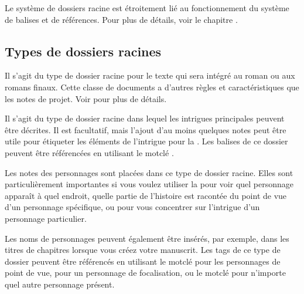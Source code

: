 \documentclass[a4paper,11pt,french]{sphinxmanual}
\begin{document}
\sphinxAtStartPar
Le système de dossiers racine est étroitement lié au fonctionnement du système de balises et de références. Pour plus de détails, voir le chapitre {\hyperref[\detokenize{project_references:a-references}]{}}.


\subsection{Types de dossiers racines}
\label{\detokenize{project_overview:root-folder-types}}\begin{description}
\sphinxAtStartPar
Il s’agit du type de dossier racine pour le texte qui sera intégré au roman ou aux romans finaux. Cette classe de documents a d’autres règles et caractéristiques que les notes de projet. Voir {\hyperref[\detokenize{project_structure:a-struct}]{}} pour plus de détails.

\sphinxAtStartPar
Il s’agit du type de dossier racine dans lequel les intrigues principales peuvent être décrites. Il est facultatif, mais l’ajout d’au moins quelques notes peut être utile pour étiqueter les éléments de l’intrigue pour la . Les balises de ce dossier peuvent être référencées en utilisant le mot\sphinxhyphen{}clé .

\sphinxAtStartPar
Les notes des personnages sont placées dans ce type de dossier racine. Elles sont particulièrement importantes si vous voulez utiliser la  pour voir quel personnage apparaît à quel endroit, quelle partie de l’histoire est racontée du point de vue d’un personnage spécifique, ou pour vous concentrer sur l’intrigue d’un personnage particulier.

\sphinxAtStartPar
Les noms de personnages peuvent également être insérés, par exemple, dans les titres de chapitres lorsque vous créez votre manuscrit. Les tags de ce type de dossier peuvent être référencés en utilisant le mot\sphinxhyphen{}clé  pour les personnages de point de vue,  pour un personnage de focalisation, ou le mot\sphinxhyphen{}clé  pour n’importe quel autre personnage présent.


\end{description}
\end{document}
